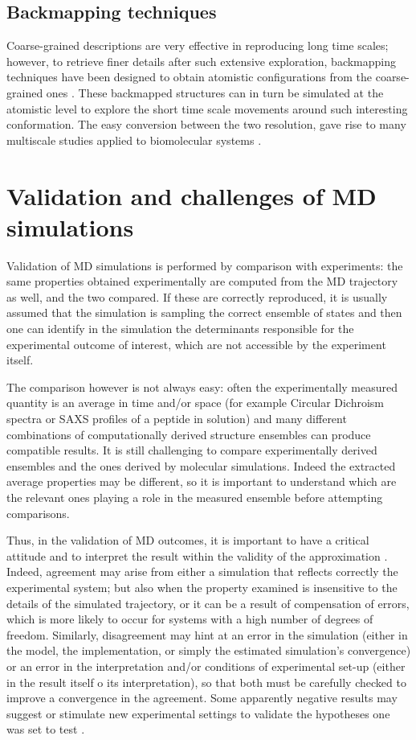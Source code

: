 \subsection{Backmapping techniques} Coarse-grained descriptions are very effective in reproducing long time scales; however, to retrieve finer details after such extensive exploration, backmapping techniques have been designed to obtain atomistic configurations from the coarse-grained ones \citep{Wassenaar2015}. These backmapped structures can in turn be simulated at the atomistic level to explore the short time scale movements around such interesting conformation. The easy conversion between the two resolution, gave rise to many multiscale studies applied to biomolecular systems \citep{Lee2012}.

\section{Validation and challenges of MD simulations}

Validation of MD simulations is performed by comparison with experiments: the same properties obtained experimentally are computed from the MD trajectory as well, and the two compared. If these are correctly reproduced, it is usually assumed that the simulation is sampling the correct ensemble of states and then one can identify in the simulation the determinants responsible for the experimental outcome of interest, which are not accessible by the experiment itself.

The comparison however is not always easy: often the experimentally measured quantity is an average in time and/or space (for example Circular Dichroism spectra or SAXS profiles of a peptide in solution) and many different combinations of computationally derived structure ensembles can produce compatible results. It is still challenging to compare experimentally derived ensembles and the ones derived by molecular simulations. Indeed the extracted average properties may be different, so it is important to understand which are the relevant ones playing a role in the measured ensemble before attempting comparisons.

Thus, in the validation of MD outcomes, it is important to have a critical attitude and to interpret the result within the validity of the approximation \citep{VanGunsteren2008}.
%
Indeed, agreement may arise from either a simulation that reflects correctly the experimental system; but also when the property examined is insensitive to the details of the simulated trajectory, or it can be a result of compensation of errors, which is more likely to  occur for systems with a high number of degrees of freedom.
%
Similarly, disagreement may hint at an error in the simulation (either in the model, the implementation, or simply the estimated simulation's convergence) or an error in the interpretation and/or conditions of experimental set-up (either in the result itself o its interpretation), so that both must be carefully checked to improve a convergence in the agreement.
%
Some apparently negative results may suggest or stimulate new experimental settings to validate the hypotheses one was set to test \citep{Goncalves2013,Meissner2014}.

